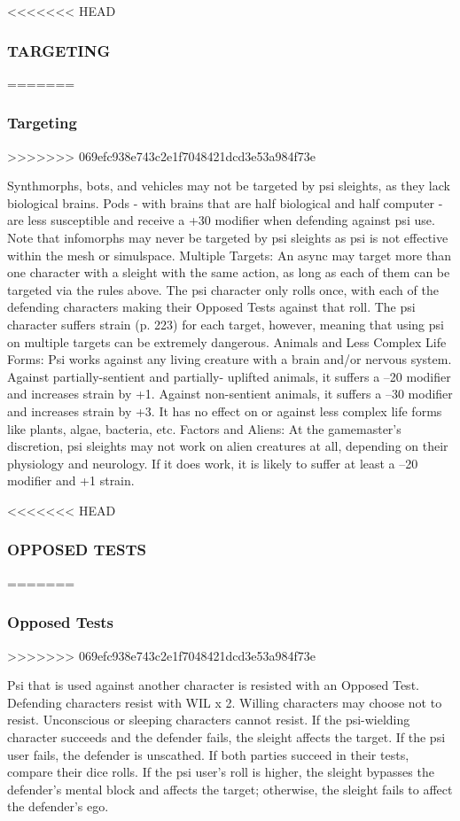 <<<<<<< HEAD \subsubsection{TARGETING} ======= \subsubsection{Targeting} >>>>>>> 069efc938e743c2e1f7048421dcd3e53a984f73e 

Synthmorphs, bots, and vehicles may not be targeted by psi sleights, as they lack biological brains. Pods - with brains that are half biological and half computer - are less susceptible and receive a +30 modifier when defending against psi use. Note that infomorphs may never be targeted by psi sleights as psi is not effective within the mesh or simulspace. Multiple Targets: An async may target more than one character with a sleight with the same action, as long as each of them can be targeted via the rules above. The psi character only rolls once, with each of the defending characters making their Opposed Tests against that roll. The psi character suffers strain (p. 223) for each target, however, meaning that using psi on multiple targets can be extremely dangerous. Animals and Less Complex Life Forms: Psi works against any living creature with a brain and/or nervous system. Against partially-sentient and partially- uplifted animals, it suffers a –20 modifier and increases strain by +1. Against non-sentient animals, it suffers a –30 modifier and increases strain by +3. It has no effect on or against less complex life forms like plants, algae, bacteria, etc. Factors and Aliens: At the gamemaster’s discretion, psi sleights may not work on alien creatures at all, depending on their physiology and neurology. If it does work, it is likely to suffer at least a –20 modifier and +1 strain. 

<<<<<<< HEAD \subsubsection{OPPOSED TESTS} ======= \subsubsection{Opposed Tests} >>>>>>> 069efc938e743c2e1f7048421dcd3e53a984f73e 

Psi that is used against another character is resisted with an Opposed Test. Defending characters resist with WIL x 2. Willing characters may choose not to resist. Unconscious or sleeping characters cannot resist. If the psi-wielding character succeeds and the defender fails, the sleight affects the target. If the psi user fails, the defender is unscathed. If both parties succeed in their tests, compare their dice rolls. If the psi user’s roll is higher, the sleight bypasses the defender’s mental block and affects the target; otherwise, the sleight fails to affect the defender’s ego. 

